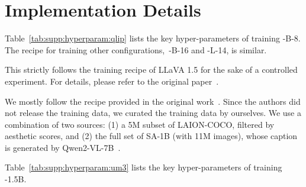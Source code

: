 \clearpage
\setcounter{page}{1}
\appendix

\section{Implementation Details}
\label{sec:supp:details}

Table~\ref{tab:supp:hyperparam:qlip} lists the key hyper-parameters of training \ours-B-8.
The recipe for training other configurations,~\eg \ours-B-16 and \ours-L-14, is similar.

This strictly follows the training recipe of LLaVA 1.5 for the sake of a controlled experiment.
For details, please refer to the original paper~\cite{liu2024llava1.5}.

We mostly follow the recipe provided in the original work~\cite{sun2024llamagen}.
Since the authors did not release the training data, we curated the training data by ourselves.
We use a combination of two sources: (1) a 5M subset of LAION-COCO, filtered by aesthetic scores, and
(2) the full set of SA-1B (with 11M images), whose caption is generated by Qwen2-VL-7B~\cite{wang2024qwen2vl}.

Table~\ref{tab:supp:hyperparam:um3} lists the key hyper-parameters of training \ourlm-1.5B.


